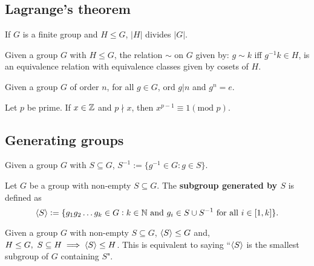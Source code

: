 \subsection{Lagrange's theorem}

\begin{theorem}
    If $G$ is a finite group and $H\leq G$, $|H|$ divides $|G|$.
\end{theorem}

\begin{corollary}
    Given a group $G$ with $H\leq G$, the relation $\sim$ on $G$ given by: $g\sim k$ iff $g^{-1}k\in H$, is an equivalence relation with equivalence classes given by cosets of $H$.
\end{corollary}

\begin{corollary}
    Given a group $G$ of order $n$, for all $g\in G$, $\text{ord }g|n$ and $g^n=e$.
\end{corollary}

\begin{corollary}
    Let $p$ be prime. If $x\in\mathbb{Z}$ and $p\nmid x$, then $x^{p-1}\equiv 1 (\text{mod }p)$.
\end{corollary}

\subsection{Generating groups}

\begin{definition}
    Given a group $G$ with $S\subseteq G$, $S^{-1}:=\{g^{-1}\in G:g\in S\}$.
\end{definition}

\begin{definition}
    Let $G$ be a group with non-empty $S\subseteq G$. The \textbf{subgroup generated by $S$} is defined as \[
        \abr{S} := \{g_1g_2\ldots g_k\in G: k\in\NN \ \text{\textcolor{black}{and }} g_i\in S\cup S^{-1} \ \text{\textcolor{black}{for all }} i\in[1,k]\}
        \textcolor{black}{.}
    \]
\end{definition}

\begin{lemma}
    Given a group $G$ with non-empty $S\subseteq G$, $\left\langle S \right\rangle\leq G$ and, $H\leq G, \ S\subseteq H \implies \left\langle S \right\rangle \leq H$. This is equivalent to saying ``$\left\langle S \right\rangle$ is the smallest subgroup of $G$ containing $S$".
\end{lemma}

